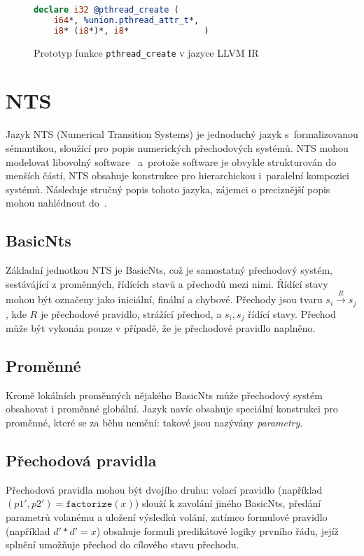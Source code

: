 \documentclass[12pt]{fithesis2}
\begin{document}
\begin{figure}[h!]
\begin{lstlisting}[language=llvm]
declare i32 @pthread_create (
	i64*, %union.pthread_attr_t*,
	i8* (i8*)*, i8*               )
\end{lstlisting}
\label{fig:pthread-create-llvm}
\caption{Prototyp funkce \texttt{pthread_create} v jazyce LLVM IR}
\end{figure}

\section{NTS}
Jazyk NTS (Numerical Transition Systems) je jednoduchý jazyk s~formalizovanou sémantikou, sloužící pro popis numerických přechodových systémů. NTS mohou modelovat libovolný software~\cite{NTSref} a~protože software je obvykle strukturován do menších částí, NTS obsahuje konstrukce pro hierarchickou i~paralelní kompozici systémů. Následuje stručný popis tohoto jazyka, zájemci o preciznější popis mohou nahlédnout do~\cite{NTSref}.

\subsection{BasicNts}
Základní jednotkou NTS je BasicNts, což je samostatný přechodový systém, sestávájící z proměnných, řídících stavů a přechodů mezi nimi. Řídící stavy mohou být označeny jako iniciální, finální a chybové. Přechody jsou tvaru $s_i \overset{R}{\rightarrow} s_j$, kde $R$ je přechodové pravidlo, strážící přechod, a $s_i, s_j$ řídící stavy. Přechod může být vykonán pouze v případě, že je přechodové pravidlo naplněno.

\subsection{Proměnné}
Kromě lokálních proměnných nějakého BasicNts může přechodový systém obsahovat i proměnné globální. Jazyk navíc obsahuje speciální konstrukci pro proměnné, které se za běhu nemění: takové jsou nazývány \textit{parametry}.

\subsection{Přechodová pravidla}
Přechodová pravidla mohou být dvojího druhu: volací pravidlo (například  $(p1',p2') = \texttt{factorize} (x)$) slouží k zavolání jiného BasicNts, předání parametrů volanému a uložení výsledků volání, zatímco formulové pravidlo (například $d' * d' = x$) obsahuje formuli predikátové logiky prvního řádu, jejíž splnění umožňuje přechod do cílového stavu přechodu. 
\end{document}
